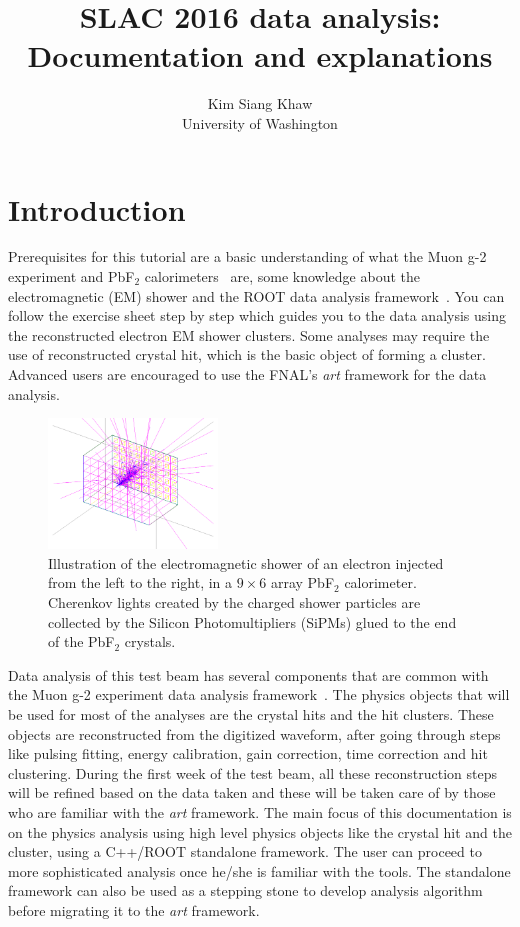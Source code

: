 \documentclass[12pt,letterpaper]{article}
\author{Kim Siang Khaw \\
University of Washington}
\title{\textbf{SLAC 2016 data analysis: Documentation and explanations}}
\begin{document}
\maketitle

\section{Introduction}
Prerequisites for this tutorial are a basic understanding of what the Muon g-2 experiment and PbF$_2$ calorimeters~\cite{Fienberg2015} are, some knowledge about the electromagnetic (EM) shower and the ROOT data analysis framework~\cite{ROOT}. You can follow the exercise sheet step by step which guides you to the data analysis using the reconstructed electron EM shower clusters. Some analyses may require the use of reconstructed crystal hit, which is the basic object of forming a cluster. Advanced users are encouraged to use the FNAL's \textit{art} framework for the data analysis.
%
\begin{figure}[htbp]
\centering
\includegraphics[trim=3cm 1cm 3cm 0cm, width=0.4\textwidth]{pics/EMShower}
\caption{Illustration of the electromagnetic shower of an electron injected from the left to the right, in a $9\times6$ array PbF$_2$ calorimeter. Cherenkov lights created by the charged shower particles are collected by the Silicon Photomultipliers (SiPMs) glued to the end of the PbF$_2$ crystals.}
\end{figure}

Data analysis of this test beam has several components that are common with the Muon g-2 experiment data analysis framework~\cite{Khaw2016}. The physics objects that will be used for most of the analyses are the crystal hits and the hit clusters.
These objects are reconstructed from the digitized waveform, after going through steps like pulsing fitting, energy calibration, gain correction, time correction and hit clustering. During the first week of the test beam, all these reconstruction steps
will be refined based on the data taken and these will be taken care of by those who are familiar with the \textit{art} framework. The main focus of this documentation is on the physics analysis using high level physics objects like the crystal hit and the cluster, using a C++/ROOT standalone framework. The user can proceed to more sophisticated analysis once he/she is familiar with the tools. The standalone framework can also be used as a stepping stone to develop analysis algorithm before migrating it to the \textit{art} framework.
\end{document}
